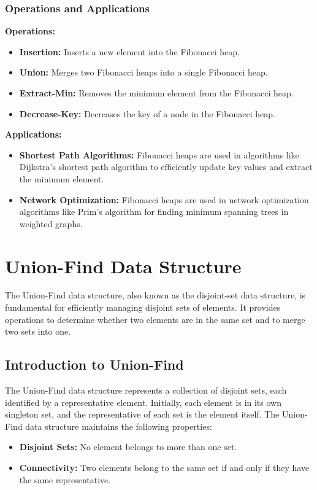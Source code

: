 \documentclass[12pt]{book} %
\begin{document}
\subsubsection{Operations and Applications}
\textbf{Operations:}
\begin{itemize}
    \item \textbf{Insertion:} Inserts a new element into the Fibonacci heap.
    \item \textbf{Union:} Merges two Fibonacci heaps into a single Fibonacci heap.
    \item \textbf{Extract-Min:} Removes the minimum element from the Fibonacci heap.
    \item \textbf{Decrease-Key:} Decreases the key of a node in the Fibonacci heap.
\end{itemize}

\textbf{Applications:}
\begin{itemize}
    \item \textbf{Shortest Path Algorithms:} Fibonacci heaps are used in algorithms like Dijkstra's shortest path algorithm to efficiently update key values and extract the minimum element.
    \item \textbf{Network Optimization:} Fibonacci heaps are used in network optimization algorithms like Prim's algorithm for finding minimum spanning trees in weighted graphs.
\end{itemize}


\section{Union-Find Data Structure}

The Union-Find data structure, also known as the disjoint-set data structure, is fundamental for efficiently managing disjoint sets of elements. It provides operations to determine whether two elements are in the same set and to merge two sets into one.

\subsection{Introduction to Union-Find}

The Union-Find data structure represents a collection of disjoint sets, each identified by a representative element. Initially, each element is in its own singleton set, and the representative of each set is the element itself. The Union-Find data structure maintains the following properties:

\begin{itemize}
    \item \textbf{Disjoint Sets:} No element belongs to more than one set.
    \item \textbf{Connectivity:} Two elements belong to the same set if and only if they have the same representative.
\end{itemize}
\end{document}
